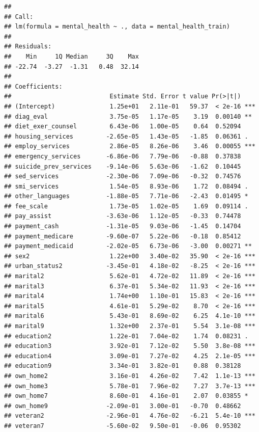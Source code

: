 \documentclass[
]{article}
\begin{document}
\begin{verbatim}
## 
## Call:
## lm(formula = mental_health ~ ., data = mental_health_train)
## 
## Residuals:
##    Min     1Q Median     3Q    Max 
## -22.74  -3.27  -1.31   0.48  32.14 
## 
## Coefficients:
##                           Estimate Std. Error t value Pr(>|t|)    
## (Intercept)               1.25e+01   2.11e-01   59.37  < 2e-16 ***
## diag_eval                 3.75e-05   1.17e-05    3.19  0.00140 ** 
## diet_exer_counsel         6.43e-06   1.00e-05    0.64  0.52094    
## housing_services         -2.65e-05   1.43e-05   -1.85  0.06361 .  
## employ_services           2.86e-05   8.26e-06    3.46  0.00055 ***
## emergency_services       -6.86e-06   7.79e-06   -0.88  0.37838    
## suicide_prev_services    -9.14e-06   5.63e-06   -1.62  0.10445    
## sed_services             -2.30e-06   7.09e-06   -0.32  0.74576    
## smi_services              1.54e-05   8.93e-06    1.72  0.08494 .  
## other_languages          -1.88e-05   7.71e-06   -2.43  0.01495 *  
## fee_scale                 1.73e-05   1.02e-05    1.69  0.09114 .  
## pay_assist               -3.63e-06   1.12e-05   -0.33  0.74478    
## payment_cash             -1.31e-05   9.03e-06   -1.45  0.14704    
## payment_medicare         -9.60e-07   5.22e-06   -0.18  0.85412    
## payment_medicaid         -2.02e-05   6.73e-06   -3.00  0.00271 ** 
## sex2                      1.22e+00   3.40e-02   35.90  < 2e-16 ***
## urban_status2            -3.45e-01   4.18e-02   -8.25  < 2e-16 ***
## marital2                  5.62e-01   4.72e-02   11.89  < 2e-16 ***
## marital3                  6.37e-01   5.34e-02   11.93  < 2e-16 ***
## marital4                  1.74e+00   1.10e-01   15.83  < 2e-16 ***
## marital5                  4.61e-01   5.29e-02    8.70  < 2e-16 ***
## marital6                  5.43e-01   8.69e-02    6.25  4.1e-10 ***
## marital9                  1.32e+00   2.37e-01    5.54  3.1e-08 ***
## education2                1.22e-01   7.04e-02    1.74  0.08231 .  
## education3                3.92e-01   7.12e-02    5.50  3.8e-08 ***
## education4                3.09e-01   7.27e-02    4.25  2.1e-05 ***
## education9                3.34e-01   3.82e-01    0.88  0.38128    
## own_home2                 3.16e-01   4.26e-02    7.42  1.1e-13 ***
## own_home3                 5.78e-01   7.96e-02    7.27  3.7e-13 ***
## own_home7                 8.60e-01   4.16e-01    2.07  0.03855 *  
## own_home9                -2.09e-01   3.00e-01   -0.70  0.48662    
## veteran2                 -2.96e-01   4.76e-02   -6.21  5.4e-10 ***
## veteran7                 -5.60e-02   9.50e-01   -0.06  0.95302    

\end{verbatim}
\end{document}
